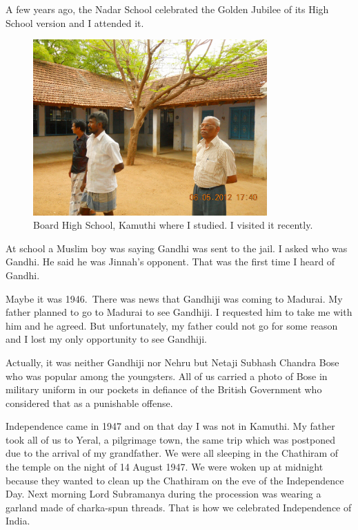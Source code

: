 A few years ago, the Nadar School celebrated the Golden Jubilee of its 
High School version and I attended it.

\begin{figure}[H]
\centering
\includegraphics[width=0.8\textwidth]{images/new-images/04-Rajaji-school.jpg}
\caption{\small{Board High School, Kamuthi where I studied. I visited it recently.}}
\end{figure}

At school a Muslim boy was saying Gandhi was sent to the jail. I asked 
who was Gandhi. He said he was Jinnah's opponent. That was the first 
time I heard of Gandhi.

Maybe it was 1946.\ There was news that Gandhiji was coming to Madurai. 
My father planned to go to Madurai to see Gandhiji. I requested him to 
take me with him and he agreed. But unfortunately, my father could not 
go for some reason and I lost my only opportunity to see Gandhiji.

Actually, it was neither Gandhiji nor Nehru but Netaji Subhash Chandra 
Bose who was popular among the youngsters. All of us carried a photo of 
Bose in military uniform in our pockets in defiance of the British 
Government who considered that as a punishable offense.

Independence came in 1947 and on that day I was not in Kamuthi. My 
father took all of us to Yeral, a pilgrimage town, the same trip which 
was postponed due to the arrival of my grandfather. We were all sleeping 
in the Chathiram of the temple on the night of 14 August 1947. We were 
woken up at midnight because they wanted to clean up the Chathiram on 
the eve of the Independence Day. Next morning Lord Subramanya during the 
procession was wearing a garland made of charka-spun threads. That is 
how we celebrated Independence of India.

